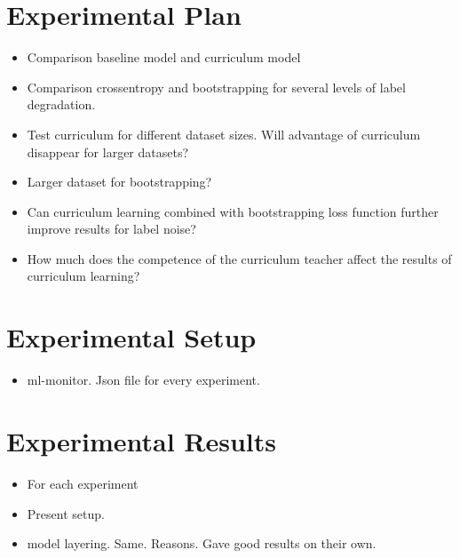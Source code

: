 \documentclass[a4paper]{book}
\begin{document}
\section{Experimental Plan}
\label{sec:experimentalPlan}
\begin{itemize}
\item Comparison baseline model and curriculum model
\item Comparison crossentropy and bootstrapping for several
levels of label degradation. 
\item Test curriculum for different dataset sizes. Will advantage of curriculum disappear for larger datasets?
\item Larger dataset for bootstrapping?
\item Can curriculum learning combined with bootstrapping loss function further improve results for label noise?
\item How much does the competence of the curriculum teacher affect the results of curriculum learning?
\end{itemize}

\section{Experimental Setup}
\label{sec:experimentalSetup}
\begin{itemize}
\item ml-monitor. Json file for every experiment.
\end{itemize}

\section{Experimental Results}
\label{sec:experimentalResults}
\begin{itemize}
\item For each experiment
\item Present setup.
\item model layering. Same. Reasons. Gave good results on their own.
\end{itemize}
\end{document}
